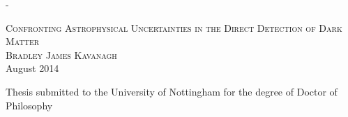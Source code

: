 \calccentering{\unitlength}                         %
\begin{adjustwidth*}{\unitlength}{-\unitlength}     %
    \begin{adjustwidth}{-1cm}{-1cm}                 %
      \begin{titlingpage}
      \begin{center}


      \textsc{\LARGE Confronting Astrophysical Uncertainties in the Direct Detection of Dark Matter}\\[1.5cm]

      \textsc{\Large Bradley James Kavanagh}\\[0.5cm]

      {\large August 2014}

\vfill

      { \large Thesis submitted to the University of Nottingham for the degree of Doctor of Philosophy}





      \end{center}
      \end{titlingpage}
    \end{adjustwidth}
\end{adjustwidth*}
